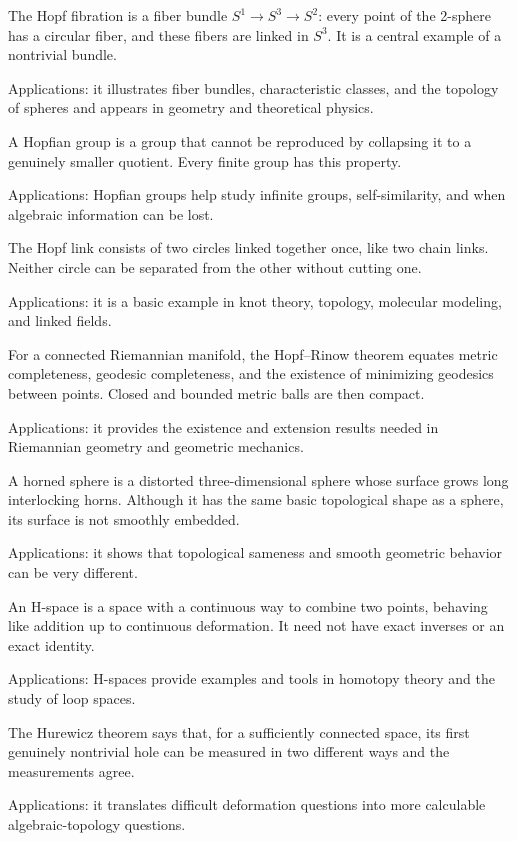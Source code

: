 The Hopf fibration is a fiber bundle $S^1\to S^3\to S^2$: every point of the 2-sphere has a circular fiber, and these fibers are linked in $S^3$. It is a central example of a nontrivial bundle. \par\noindent Applications: it illustrates fiber bundles, characteristic classes, and the topology of spheres and appears in geometry and theoretical physics.

A Hopfian group is a group that cannot be reproduced by collapsing it to a genuinely smaller quotient. Every finite group has this property. \par\noindent Applications: Hopfian groups help study infinite groups, self-similarity, and when algebraic information can be lost.

The Hopf link consists of two circles linked together once, like two chain links. Neither circle can be separated from the other without cutting one. \par\noindent Applications: it is a basic example in knot theory, topology, molecular modeling, and linked fields.

For a connected Riemannian manifold, the Hopf--Rinow theorem equates metric completeness, geodesic completeness, and the existence of minimizing geodesics between points. Closed and bounded metric balls are then compact. \par\noindent Applications: it provides the existence and extension results needed in Riemannian geometry and geometric mechanics.

A horned sphere is a distorted three-dimensional sphere whose surface grows long interlocking horns. Although it has the same basic topological shape as a sphere, its surface is not smoothly embedded. \par\noindent Applications: it shows that topological sameness and smooth geometric behavior can be very different.

An H-space is a space with a continuous way to combine two points, behaving like addition up to continuous deformation. It need not have exact inverses or an exact identity. \par\noindent Applications: H-spaces provide examples and tools in homotopy theory and the study of loop spaces.

The Hurewicz theorem says that, for a sufficiently connected space, its first genuinely nontrivial hole can be measured in two different ways and the measurements agree. \par\noindent Applications: it translates difficult deformation questions into more calculable algebraic-topology questions.


